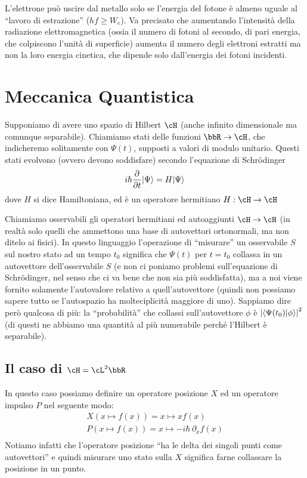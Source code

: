 \documentclass[10pt,a4paper]{article}
\begin{document}
\begin{multicols}{2}
  L'elettrone può uscire dal metallo solo se l'energia del fotone è almeno uguale al ``lavoro di estrazione'' ($hf \ge W_e$). Va precisato che aumentando l'intensità della radiazione elettromagnetica (ossia il numero di fotoni al secondo, di pari energia, che colpiscono l'unità di superficie) aumenta il numero degli elettroni estratti ma non la loro energia cinetica, che dipende solo dall'energia dei fotoni incidenti.
  
  \section*{Meccanica Quantistica}
  Supponiamo di avere uno spazio di Hilbert $\cH$ (anche infinito dimensionale ma comunque separabile). Chiamiamo stati delle funzioni $\bbR \rar \cH$, che indicheremo solitamente con $\Psi(t)$, supposti a valori di modulo unitario. Questi stati evolvono (ovvero devono soddisfare) secondo l'equazione di Schrödinger
  $$ i \hbar \frac{\partial {}}{\partial {t}} |\Psi\rangle = H |\Psi\rangle $$
  dove $H$ si dice Hamiltoniana, ed è un operatore hermitiano $H: \cH \rar \cH$
  
  Chiamiamo osservabili gli operatori hermitiani ed autoaggiunti $\cH \rar \cH$ (in realtà solo quelli che ammettono una base di autovettori ortonormali, ma non ditelo ai fisici). In questo linguaggio l'operazione di ``misurare'' un osservabile $S$ sul nostro stato ad un tempo $t_0$ significa che $\Psi(t)$ per $t = t_0$ collassa in un autovettore dell'osservabile $S$ (e non ci poniamo problemi sull'equazione di Schrödinger, nel senso che ci va bene che non sia più soddisfatta), ma a noi viene fornito solamente l'autovalore relativo a quell'autovettore (quindi non possiamo sapere tutto se l'autospazio ha molteciplicità maggiore di uno). Sappiamo dire però qualcosa di più: la ``probabilità'' che collassi sull'autovettore $\phi$ è $\left|{\langle \Psi(t_0) | \phi \rangle}\right|^2$ (di questi ne abbiamo una quantità al più numerabile perché l'Hilbert è separabile).

  \subsection*{Il caso di $\cH = \cL^2 \bbR$}
  In questo caso possiamo definire un operatore posizione $X$ ed un operatore impulso $P$ nel seguente modo:
  \begin{displaymath}
    \begin{array}{c}
      X(x \mapsto f(x)) = x \mapsto x f(x) \\
      P(x \mapsto f(x)) = x \mapsto -i \hbar \, \partial_x f(x) \\
    \end{array}
  \end{displaymath}
  Notiamo infatti che l'operatore posizione ``ha le delta dei singoli punti come autovettori'' e quindi misurare uno stato sulla $X$ significa farne collassare la posizione in un punto.


\end{multicols}
\end{document}

